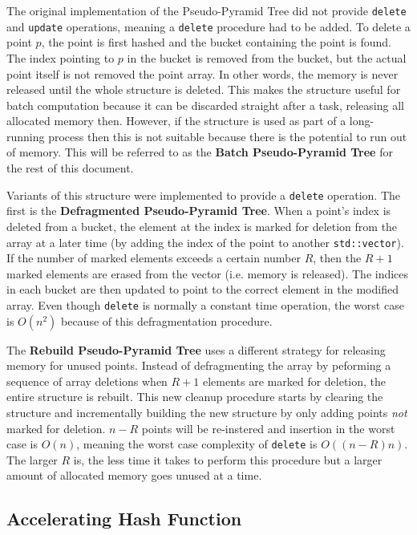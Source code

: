 The original implementation of the Pseudo-Pyramid Tree did not provide \texttt{delete} and \texttt{update} operations, meaning a \texttt{delete} procedure had to be added. To delete a point $p$, the point is first hashed and the bucket containing the point is found. The index pointing to $p$ in the bucket is removed from the bucket, but the actual point itself is not removed the point array. In other words, the memory is never released until the whole structure is deleted. This makes the structure useful for batch computation because it can be discarded straight after a task, releasing all allocated memory then. However, if the structure is used as part of a long-running process then this is not suitable because there is the potential to run out of memory. This will be referred to as the \textbf{Batch Pseudo-Pyramid Tree} for the rest of this document.

Variants of this structure were implemented to provide a \texttt{delete} operation. The first is the \textbf{Defragmented Pseudo-Pyramid Tree}. When a point's index is deleted from a bucket, the element at the index is marked for deletion from the array at a later time (by adding the index of the point to another \texttt{std::vector}). If the number of marked elements exceeds a certain number $R$, then the $R + 1$ marked elements are erased from the vector (i.e. memory is released). The indices in each bucket are then updated to point to the correct element in the modified array. Even though \texttt{delete} is normally a constant time operation, the worst case is $O(n^2)$ because of this defragmentation procedure.

The \textbf{Rebuild Pseudo-Pyramid Tree} uses a different strategy for releasing memory for unused points. Instead of defragmenting the array by peforming a sequence of array deletions when $R + 1$ elements are marked for deletion, the entire structure is rebuilt. This new cleanup procedure starts by clearing the structure and incrementally building the new structure by only adding points \textit{not} marked for deletion. $n - R$ points will be re-instered and insertion in the worst case is $O(n)$, meaning the worst case complexity of \texttt{delete} is $O((n - R)n)$. The larger $R$ is, the less time it takes to perform this procedure but a larger amount of allocated memory goes unused at a time.

\subsection{Accelerating Hash Function}

